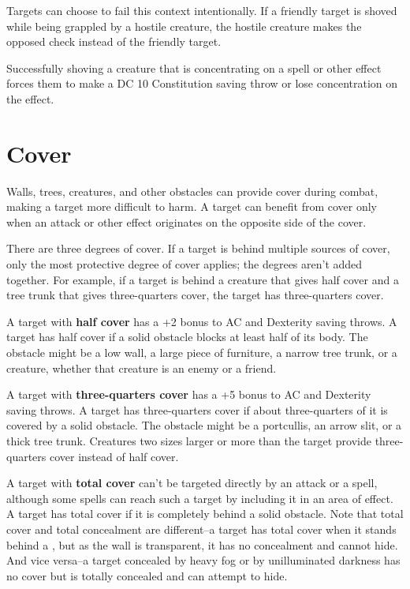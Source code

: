 Targets can choose to fail this context intentionally. If a friendly target is shoved while being grappled by a hostile creature, the hostile creature makes the opposed check instead of the friendly target.

Successfully shoving a creature that is concentrating on a spell or other effect forces them to make a DC 10 Constitution saving throw or lose concentration on the effect.

\section{Cover}

Walls, trees, creatures, and other obstacles can provide cover during combat, making a target more difficult to harm. A target can benefit from cover only when an attack or other effect originates on the opposite side of the cover.

There are three degrees of cover. If a target is behind multiple sources of cover, only the most protective degree of cover applies; the degrees aren't added together. For example, if a target is behind a creature that gives half cover and a tree trunk that gives three-quarters cover, the target has three-quarters cover.

A target with \textbf{half cover} has a +2 bonus to AC and Dexterity saving throws. A target has half cover if a solid obstacle blocks at least half of its body. The obstacle might be a low wall, a large piece of furniture, a narrow tree trunk, or a creature, whether that creature is an enemy or a friend.

A target with \textbf{three-quarters cover} has a +5 bonus to AC and Dexterity saving throws. A target has three-quarters cover if about three-quarters of it is covered by a solid obstacle. The obstacle might be a portcullis, an arrow slit, or a thick tree trunk. Creatures two sizes larger or more than the target provide three-quarters cover instead of half cover. 

A target with \textbf{total cover} can't be targeted directly by an attack or a spell, although some spells can reach such a target by including it in an area of effect. A target has total cover if it is completely behind a solid obstacle. Note that total cover and total concealment are different--a target has total cover when it stands behind a , but as the wall is transparent, it has no concealment and cannot hide. And vice versa--a target concealed by heavy fog or by unilluminated darkness has no cover but is totally concealed and can attempt to hide.

